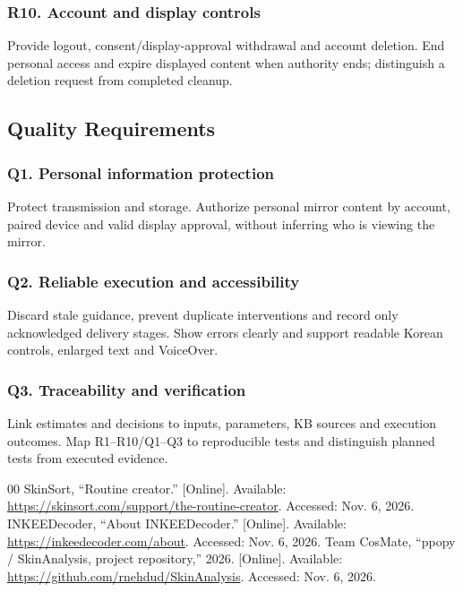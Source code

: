 \documentclass[conference,letterpaper]{IEEEtran}
\begin{document}
\subsubsection*{R10. Account and display controls}

Provide logout, consent/display-approval withdrawal and account deletion. End personal access and expire displayed content when authority ends; distinguish a deletion request from completed cleanup.

\newpage
\subsection{Quality Requirements}

\subsubsection*{Q1. Personal information protection}

Protect transmission and storage. Authorize personal mirror content by account, paired device and valid display approval, without inferring who is viewing the mirror.

\subsubsection*{Q2. Reliable execution and accessibility}

Discard stale guidance, prevent duplicate interventions and record only acknowledged delivery stages. Show errors clearly and support readable Korean controls, enlarged text and VoiceOver.

\subsubsection*{Q3. Traceability and verification}

Link estimates and decisions to inputs, parameters, KB sources and execution outcomes. Map R1--R10/Q1--Q3 to reproducible tests and distinguish planned tests from executed evidence.
\begin{thebibliography}{00}
 SkinSort, ``Routine creator.'' [Online]. Available: \url{https://skinsort.com/support/the-routine-creator}. Accessed: Nov. 6, 2026.
 INKEEDecoder, ``About INKEEDecoder.'' [Online]. Available: \url{https://inkeedecoder.com/about}. Accessed: Nov. 6, 2026.
 Team CosMate, ``ppopy / SkinAnalysis, project repository,'' 2026. [Online]. Available: \url{https://github.com/rnehdud/SkinAnalysis}. Accessed: Nov. 6, 2026.
\end{thebibliography}
\end{document}

